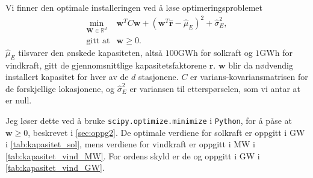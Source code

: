 \documentclass{article}
\begin{document}
\subsubsection{}
Vi finner den optimale installeringen ved å løse optimeringsproblemet
\begin{equation}
\begin{array}{clcc}
    \min\limits_{\mathbf{W} \in \mathbb{R}^d} & \mathbf{w}^T C \mathbf{w} + \left( \mathbf{w}^T \hat{\mathbf{r}} - \hat{\mu}_E \right)^2 + \hat{\sigma}_E^2, \\
    \text{gitt at} & \mathbf{w} \geq 0.
\end{array}
\end{equation}
$\hat{\mu}_E$ tilsvarer den ønskede kapasiteten, altså $100$GWh for solkraft og $1$GWh for vindkraft, gitt de gjennomsnittlige kapasitetsfaktorene $\hat{\mathbf{r}}$.
$\mathbf{w}$ blir da nødvendig installert kapasitet for hver av de $d$ stasjonene.
$C$ er varians-kovariansmatrisen for de forskjellige lokasjonene, og $\hat{\sigma}_E^2$ er variansen til etterspørselen, som vi antar at er null.

Jeg løser dette ved å bruke \verb|scipy.optimize.minimize| i \verb|Python|, for å påse at $\mathbf{w} \geq 0$, beskrevet i \autoref{sec:oppg2}.
De optimale verdiene for solkraft er oppgitt i GW i \autoref{tab:kapasitet_sol}, mens verdiene for vindkraft er oppgitt i MW i \autoref{tab:kapasitet_vind_MW}. For ordens skyld er de og oppgitt i GW i \autoref{tab:kapasitet_vind_GW}.
\end{document}
